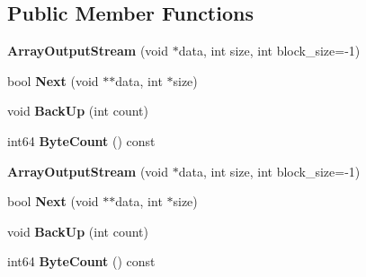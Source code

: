 \subsection*{Public Member Functions}
\begin{DoxyCompactItemize}
\item 
\mbox{\label{classgoogle_1_1protobuf_1_1io_1_1ArrayOutputStream_a7ea99ec10889b22deb27644d1d48f3c6}} 
{\bfseries Array\+Output\+Stream} (void $\ast$data, int size, int block\+\_\+size=-\/1)
\item 
\mbox{\label{classgoogle_1_1protobuf_1_1io_1_1ArrayOutputStream_aaee555198a58d97b1edf3ff667106b68}} 
bool {\bfseries Next} (void $\ast$$\ast$data, int $\ast$size)
\item 
\mbox{\label{classgoogle_1_1protobuf_1_1io_1_1ArrayOutputStream_a359a9fc2aa00661dcdb6baf3e2f3f3b4}} 
void {\bfseries Back\+Up} (int count)
\item 
\mbox{\label{classgoogle_1_1protobuf_1_1io_1_1ArrayOutputStream_ae2777d73e3d54f118c47b619cdbb4329}} 
int64 {\bfseries Byte\+Count} () const
\item 
\mbox{\label{classgoogle_1_1protobuf_1_1io_1_1ArrayOutputStream_a7ea99ec10889b22deb27644d1d48f3c6}} 
{\bfseries Array\+Output\+Stream} (void $\ast$data, int size, int block\+\_\+size=-\/1)
\item 
\mbox{\label{classgoogle_1_1protobuf_1_1io_1_1ArrayOutputStream_aaee555198a58d97b1edf3ff667106b68}} 
bool {\bfseries Next} (void $\ast$$\ast$data, int $\ast$size)
\item 
\mbox{\label{classgoogle_1_1protobuf_1_1io_1_1ArrayOutputStream_a359a9fc2aa00661dcdb6baf3e2f3f3b4}} 
void {\bfseries Back\+Up} (int count)
\item 
\mbox{\label{classgoogle_1_1protobuf_1_1io_1_1ArrayOutputStream_ae2777d73e3d54f118c47b619cdbb4329}} 
int64 {\bfseries Byte\+Count} () const
\end{DoxyCompactItemize}


